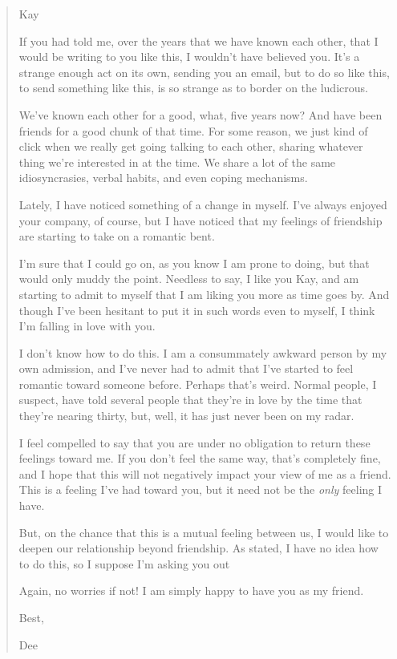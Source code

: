 \begin{quote}
\color{DarkSlateGray}
Kay

If you had told me, over the years that we have known each other, that I would be writing to you like this, I wouldn't have believed you. It's a strange enough act on its own, sending you an email, but to do so like this, to send something like this, is so strange as to border on the ludicrous.

We've known each other for a good, what, five years now? And have been friends for a good chunk of that time. For some reason, we just kind of click when we really get going talking to each other, sharing whatever thing we're interested in at the time. We share a lot of the same idiosyncrasies, verbal habits, and even coping mechanisms.

Lately, I have noticed something of a change in myself. I've always enjoyed your company, of course, but I have noticed that my feelings of friendship are starting to take on a romantic bent.

I'm sure that I could go on, as you know I am prone to doing, but that would only muddy the point. Needless to say, I like you Kay, and am starting to admit to myself that I am liking you more as time goes by. And though I've been hesitant to put it in such words even to myself, I think I'm falling in love with you.

I don't know how to do this. I am a consummately awkward person by my own admission, and I've never had to admit that I've started to feel romantic toward someone before. Perhaps that's weird. Normal people, I suspect, have told several people that they're in love by the time that they're nearing thirty, but, well, it has just never been on my radar.

I feel compelled to say that you are under no obligation to return these feelings toward me. If you don't feel the same way, that's completely fine, and I hope that this will not negatively impact your view of me as a friend. This is a feeling I've had toward you, but it need not be the \emph{only} feeling I have.

But, on the chance that this is a mutual feeling between us, I would like to deepen our relationship beyond friendship. As stated, I have no idea how to do this, so I suppose I'm asking you out {}

Again, no worries if not! I am simply happy to have you as my friend.

Best,

Dee
\end{quote}

